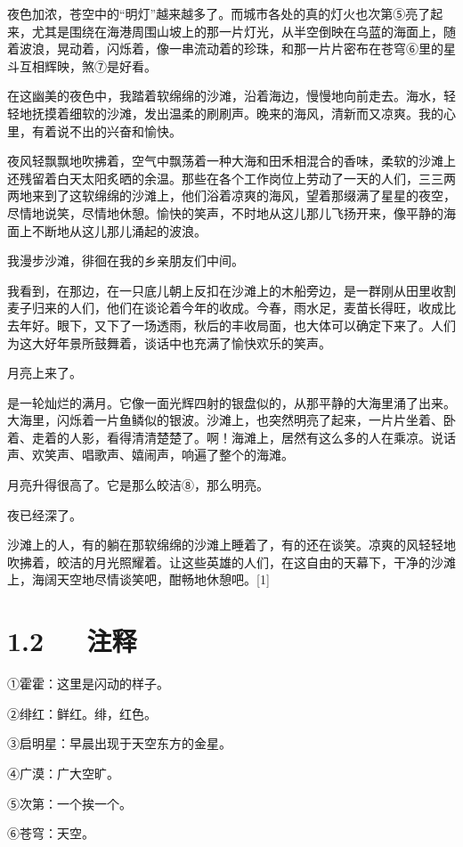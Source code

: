 \documentclass[letterpaper,12pt,english]{sphinxmanual}
\begin{document}
夜色加浓，苍空中的“明灯”越来越多了。而城市各处的真的灯火也次第⑤亮了起来，尤其是围绕在海港周围山坡上的那一片灯光，从半空倒映在乌蓝的海面上，随着波浪，晃动着，闪烁着，像一串流动着的珍珠，和那一片片密布在苍穹⑥里的星斗互相辉映，煞⑦是好看。

在这幽美的夜色中，我踏着软绵绵的沙滩，沿着海边，慢慢地向前走去。海水，轻轻地抚摸着细软的沙滩，发出温柔的刷刷声。晚来的海风，清新而又凉爽。我的心里，有着说不出的兴奋和愉快。

夜风轻飘飘地吹拂着，空气中飘荡着一种大海和田禾相混合的香味，柔软的沙滩上还残留着白天太阳炙晒的余温。那些在各个工作岗位上劳动了一天的人们，三三两两地来到了这软绵绵的沙滩上，他们浴着凉爽的海风，望着那缀满了星星的夜空，尽情地说笑，尽情地休憩。愉快的笑声，不时地从这儿那儿飞扬开来，像平静的海面上不断地从这儿那儿涌起的波浪。

我漫步沙滩，徘徊在我的乡亲朋友们中间。

我看到，在那边，在一只底儿朝上反扣在沙滩上的木船旁边，是一群刚从田里收割麦子归来的人们，他们在谈论着今年的收成。今春，雨水足，麦苗长得旺，收成比去年好。眼下，又下了一场透雨，秋后的丰收局面，也大体可以确定下来了。人们为这大好年景所鼓舞着，谈话中也充满了愉快欢乐的笑声。

月亮上来了。

是一轮灿烂的满月。它像一面光辉四射的银盘似的，从那平静的大海里涌了出来。大海里，闪烁着一片鱼鳞似的银波。沙滩上，也突然明亮了起来，一片片坐着、卧着、走着的人影，看得清清楚楚了。啊！海滩上，居然有这么多的人在乘凉。说话声、欢笑声、唱歌声、嬉闹声，响遍了整个的海滩。

月亮升得很高了。它是那么皎洁⑧，那么明亮。

夜已经深了。

沙滩上的人，有的躺在那软绵绵的沙滩上睡着了，有的还在谈笑。凉爽的风轻轻地吹拂着，皎洁的月光照耀着。让这些英雄的人们，在这自由的天幕下，干净的沙滩上，海阔天空地尽情谈笑吧，酣畅地休憩吧。{[}1{]}


\section{1.2   注释}
\label{\detokenize{p01_u6563_u6587/_u5cfb_u9752-_u6d77_u6ee8_u4ef2_u590f_u591c:id4}}
①霍霍：这里是闪动的样子。

②绯红：鲜红。绯，红色。

③启明星：早晨出现于天空东方的金星。

④广漠：广大空旷。

⑤次第：一个挨一个。

⑥苍穹：天空。
\end{document}
